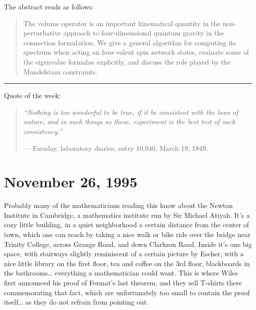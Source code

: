 \documentclass{article}
\def\tightlist{}
\renewcommand{\texttt}[1]{%
  \begingroup
  \ttfamily
  \begingroup\lccode`~=`/\lowercase{\endgroup\def~}{/\discretionary{}{}{}}%
  \begingroup\lccode`~=`[\lowercase{\endgroup\def~}{[\discretionary{}{}{}}%
  \begingroup\lccode`~=`.\lowercase{\endgroup\def~}{.\discretionary{}{}{}}%
  \catcode`/=\active\catcode`[=\active\catcode`.=\active
  \scantokens{#1\noexpand}%
  \endgroup
}
\begin{document}

The abstract reads as follows:

\begin{quote}
The volume operator is an important kinematical quantity in the
non-perturbative approach to four-dimensional quantum gravity in the
connection formulation. We give a general algorithm for computing its
spectrum when acting on four-valent spin network states, evaluate some
of the eigenvalue formulae explicitly, and discuss the role played by
the Mandelstam constraints.
\end{quote}

\begin{center}\rule{0.5\linewidth}{0.5pt}\end{center}

Quote of the week:

\begin{quote}
\emph{``Nothing is too wonderful to be true, if it be consistent with
the laws of nature, and in such things as these, experiment is the best
test of such consistency.''}

--- Faraday, laboratory diaries, entry 10,040, March 19, 1849.
\end{quote}



\hypertarget{week70}{%
\section{November 26, 1995}\label{week70}}

Probably many of the mathematicians reading this know about the Newton
Institute in Cambridge, a mathematics institute run by Sir Michael
Atiyah. It's a cozy little building, in a quiet neighborhood a certain
distance from the center of town, which one can reach by taking a nice
walk or bike ride over the bridge near Trinity College, across Grange
Road, and down Clarkson Road. Inside it's one big space, with stairways
slightly reminiscent of a certain picture by Escher, with a nice little
library on the first floor, tea and coffee on the 3rd floor, blackboards
in the bathrooms\ldots{} everything a mathematician could want. This is
where Wiles first announced his proof of Fermat's last theorem, and they
sell T-shirts there commemorating that fact, which are unfortunately too
small to contain the proof itself\ldots{} as they do not refrain from
pointing out.
\end{document}
